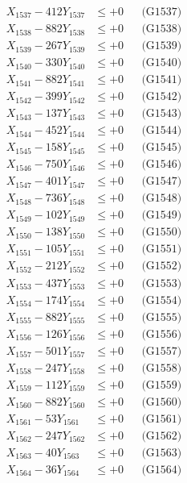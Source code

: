 \documentclass[a4paper,10pt]{article}
\begin{document}
{\begin{align}
X_{1537} - 412Y_{1537} &\leq +0 && \text{(G1537)} \\
X_{1538} - 882Y_{1538} &\leq +0 && \text{(G1538)} \\
X_{1539} - 267Y_{1539} &\leq +0 && \text{(G1539)} \\
X_{1540} - 330Y_{1540} &\leq +0 && \text{(G1540)} \\
\allowbreak
X_{1541} - 882Y_{1541} &\leq +0 && \text{(G1541)} \\
X_{1542} - 399Y_{1542} &\leq +0 && \text{(G1542)} \\
X_{1543} - 137Y_{1543} &\leq +0 && \text{(G1543)} \\
X_{1544} - 452Y_{1544} &\leq +0 && \text{(G1544)} \\
X_{1545} - 158Y_{1545} &\leq +0 && \text{(G1545)} \\
X_{1546} - 750Y_{1546} &\leq +0 && \text{(G1546)} \\
X_{1547} - 401Y_{1547} &\leq +0 && \text{(G1547)} \\
X_{1548} - 736Y_{1548} &\leq +0 && \text{(G1548)} \\
X_{1549} - 102Y_{1549} &\leq +0 && \text{(G1549)} \\
X_{1550} - 138Y_{1550} &\leq +0 && \text{(G1550)} \\
\allowbreak
X_{1551} - 105Y_{1551} &\leq +0 && \text{(G1551)} \\
X_{1552} - 212Y_{1552} &\leq +0 && \text{(G1552)} \\
X_{1553} - 437Y_{1553} &\leq +0 && \text{(G1553)} \\
X_{1554} - 174Y_{1554} &\leq +0 && \text{(G1554)} \\
X_{1555} - 882Y_{1555} &\leq +0 && \text{(G1555)} \\
X_{1556} - 126Y_{1556} &\leq +0 && \text{(G1556)} \\
X_{1557} - 501Y_{1557} &\leq +0 && \text{(G1557)} \\
X_{1558} - 247Y_{1558} &\leq +0 && \text{(G1558)} \\
X_{1559} - 112Y_{1559} &\leq +0 && \text{(G1559)} \\
X_{1560} - 882Y_{1560} &\leq +0 && \text{(G1560)} \\
\allowbreak
X_{1561} - 53Y_{1561} &\leq +0 && \text{(G1561)} \\
X_{1562} - 247Y_{1562} &\leq +0 && \text{(G1562)} \\
X_{1563} - 40Y_{1563} &\leq +0 && \text{(G1563)} \\
X_{1564} - 36Y_{1564} &\leq +0 && \text{(G1564)} \\

\end{align}}
\end{document}

